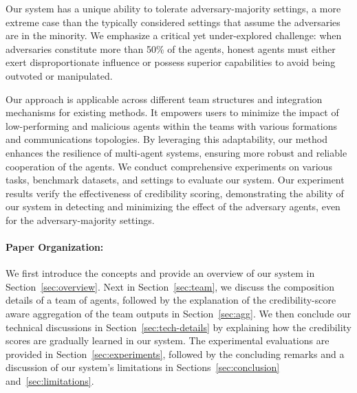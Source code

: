 Our system has a unique ability to tolerate adversary-majority settings, a more extreme case than the typically considered settings that assume the adversaries are in the minority. We emphasize a critical yet under-explored challenge: when adversaries constitute more than 50\% of the agents, honest agents must either exert disproportionate influence or possess superior capabilities to avoid being outvoted or manipulated. 

Our approach is applicable across different team structures and integration mechanisms for existing methods. It empowers users to 
minimize the impact of low-performing and malicious agents within the teams with various formations and communications topologies. By leveraging this adaptability, our method enhances the resilience of multi-agent systems, ensuring more robust and reliable cooperation of the agents. 
We conduct comprehensive experiments on various tasks, benchmark datasets, and settings to evaluate our system.
Our experiment results verify the effectiveness of credibility scoring, 
demonstrating the ability of our system in detecting and minimizing the effect of the adversary agents, even for the adversary-majority settings.
\vspace{-0.5mm}
\paragraph{Paper Organization:} 
We first introduce the concepts and provide an overview of our system in Section~\ref{sec:overview}. Next in Section~\ref{sec:team}, we discuss the composition details of a team of agents, followed by the explanation of the credibility-score aware aggregation of the team outputs in Section~\ref{sec:agg}. 
We then conclude our technical discussions in Section~\ref{sec:tech-details} by explaining how the credibility scores are gradually learned in our system.
The experimental evaluations are provided in Section~\ref{sec:experiments}, followed by the concluding remarks and a discussion of our system's limitations in Sections~\ref{sec:conclusion} and~\ref{sec:limitations}.